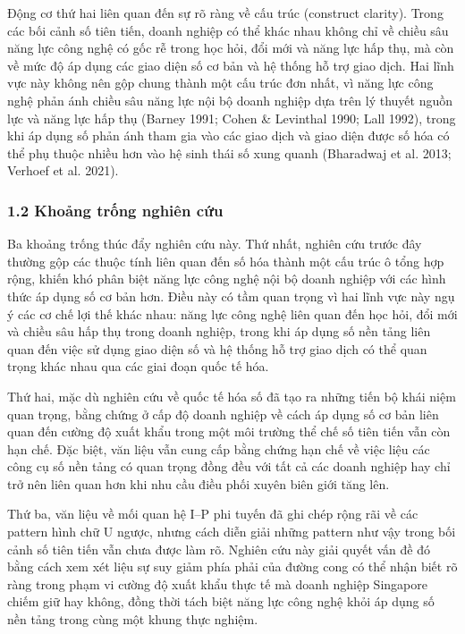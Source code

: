 \documentclass[12pt,a4paper]{article}
\begin{document}
Động cơ thứ hai liên quan đến sự rõ ràng về cấu trúc (construct
clarity). Trong các bối cảnh số tiên tiến, doanh nghiệp có thể khác nhau
không chỉ về chiều sâu năng lực công nghệ có gốc rễ trong học hỏi, đổi
mới và năng lực hấp thụ, mà còn về mức độ áp dụng các giao diện số cơ
bản và hệ thống hỗ trợ giao dịch. Hai lĩnh vực này không nên gộp chung
thành một cấu trúc đơn nhất, vì năng lực công nghệ phản ánh chiều sâu
năng lực nội bộ doanh nghiệp dựa trên lý thuyết nguồn lực và năng lực
hấp thụ (Barney 1991; Cohen \& Levinthal 1990; Lall 1992), trong khi áp
dụng số phản ánh tham gia vào các giao dịch và giao diện được số hóa có
thể phụ thuộc nhiều hơn vào hệ sinh thái số xung quanh (Bharadwaj et al.
2013; Verhoef et al. 2021).

\hypertarget{12-khoux1ea3ng-trux1ed1ng-nghiuxean-cux1ee9u}{%
\subsubsection{1.2 Khoảng trống nghiên
cứu}\label{12-khoux1ea3ng-trux1ed1ng-nghiuxean-cux1ee9u}}

Ba khoảng trống thúc đẩy nghiên cứu này. Thứ nhất, nghiên cứu trước đây
thường gộp các thuộc tính liên quan đến số hóa thành một cấu trúc ô tổng
hợp rộng, khiến khó phân biệt năng lực công nghệ nội bộ doanh nghiệp với
các hình thức áp dụng số cơ bản hơn. Điều này có tầm quan trọng vì hai
lĩnh vực này ngụ ý các cơ chế lợi thế khác nhau: năng lực công nghệ liên
quan đến học hỏi, đổi mới và chiều sâu hấp thụ trong doanh nghiệp, trong
khi áp dụng số nền tảng liên quan đến việc sử dụng giao diện số và hệ
thống hỗ trợ giao dịch có thể quan trọng khác nhau qua các giai đoạn
quốc tế hóa.

Thứ hai, mặc dù nghiên cứu về quốc tế hóa số đã tạo ra những tiến bộ
khái niệm quan trọng, bằng chứng ở cấp độ doanh nghiệp về cách áp dụng
số cơ bản liên quan đến cường độ xuất khẩu trong một môi trường thể chế
số tiên tiến vẫn còn hạn chế. Đặc biệt, văn liệu vẫn cung cấp bằng chứng
hạn chế về việc liệu các công cụ số nền tảng có quan trọng đồng đều với
tất cả các doanh nghiệp hay chỉ trở nên liên quan hơn khi nhu cầu điều
phối xuyên biên giới tăng lên.

Thứ ba, văn liệu về mối quan hệ I--P phi tuyến đã ghi chép rộng rãi về
các pattern hình chữ U ngược, nhưng cách diễn giải những pattern như vậy
trong bối cảnh số tiên tiến vẫn chưa được làm rõ. Nghiên cứu này giải
quyết vấn đề đó bằng cách xem xét liệu sự suy giảm phía phải của đường
cong có thể nhận biết rõ ràng trong phạm vi cường độ xuất khẩu thực tế
mà doanh nghiệp Singapore chiếm giữ hay không, đồng thời tách biệt năng
lực công nghệ khỏi áp dụng số nền tảng trong cùng một khung thực nghiệm.
\end{document}
